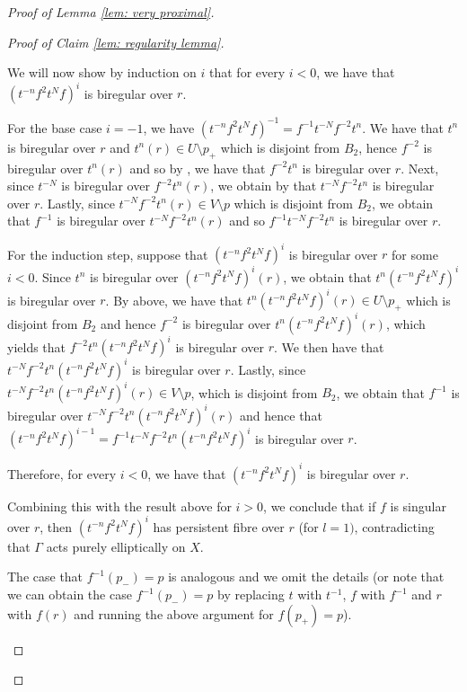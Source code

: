 \documentclass[12pt]{article}
\theoremstyle{definition}
\begin{document}
\begin{proof} [Proof of Lemma \ref{lem: very proximal}]
\begin{proof}[Proof of Claim \ref{lem: regularity lemma}]
\begin{enumerate}
\begin{enumerate}
\begin{enumerate}
        We will now show by induction on $i$ that for every $i < 0$, we have that $(t^{-n}f^2 t^N f)^i$ is biregular over $r$. 

        For the base case $i = -1$, we have $(t^{-n}f^2 t^N f)^{-1} = f^{-1}t^{-N}f^{-2}t^n$. We have that $t^n$ is biregular over $r$ and $t^n (r) \in U \setminus p_+$ which is disjoint from $B_2$, hence $f^{-2}$ is biregular over $t^n (r)$ and so by \cite[Remark 4.4]{Algebraic}, we have that $f^{-2}t^n $ is biregular over $r$. Next, since $t^{-N}$ is biregular over $f^{-2}t^n(r)$, we obtain by \cite[Remark 4.4]{Algebraic} that $t^{-N}f^{-2}t^n$ is biregular over $r$. Lastly, since $t^{-N}f^{-2}t^n(r) \in V \setminus p$ which is disjoint from $B_2$, we obtain that $f^{-1}$ is biregular over $t^{-N}f^{-2}t^n(r)$ and so $f^{-1}t^{-N}f^{-2}t^n$ is biregular over $r$. 

        For the induction step, suppose that $(t^{-n}f^2 t^N f)^i$ is biregular over $r$ for some $i < 0$. Since $t^n$ is biregular over $(t^{-n}f^2 t^N f)^i(r)$, we obtain that $t^n (t^{-n}f^2 t^N f)^i$ is biregular over $r$. By above, we have that $t^n (t^{-n}f^2 t^N f)^i (r) \in U \setminus p_+$ which is disjoint from $B_2$ and hence $f^{-2}$ is biregular over $t^n (t^{-n}f^2 t^N f)^i (r)$, which yields that $f^{-2}t^n (t^{-n}f^2 t^N f)^i$ is biregular over $r$. We then have that $t^{-N}f^{-2}t^n (t^{-n}f^2 t^N f)^i$ is biregular over $r$. Lastly, since $t^{-N}f^{-2}t^n (t^{-n}f^2 t^N f)^i(r) \in V \setminus p$, which is disjoint from $B_2$, we obtain that $f^{-1}$ is biregular over $t^{-N}f^{-2}t^n (t^{-n}f^2 t^N f)^i(r)$ and hence that $(t^{-n}f^2 t^N f)^{i-1} = f^{-1}t^{-N}f^{-2}t^n (t^{-n}f^2 t^N f)^i$ is biregular over $r$. 

        Therefore, for every $i < 0$, we have that $(t^{-n}f^2 t^N f)^i$ is biregular over $r$. 

       Combining this with the result above for $i > 0$, we conclude that if $f$ is singular over $r$, then $(t^{-n}f^2 t^N f)^i$ has persistent fibre over $r$ (for $l = 1)$, contradicting that $\Gamma$ acts purely elliptically on $X$. 


    
    The case that $f^{-1}(p_-) = p$ is analogous and we omit the details (or note that we can obtain the case $f^{-1}(p_-) = p$ by replacing $t$ with $t^{-1}$, $f$ with $f^{-1}$ and $r$ with $f(r)$ and running the above argument for $f(p_+)=p$). 
    
    \end{enumerate}
    

\end{enumerate}
\end{enumerate}
\end{proof}
\end{proof}
\end{document}
